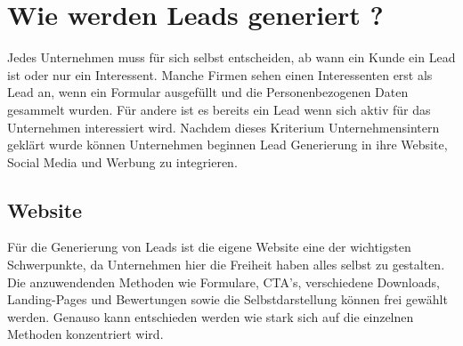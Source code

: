 \section{Wie werden Leads generiert ?}
Jedes Unternehmen muss für sich selbst entscheiden, ab wann ein Kunde ein Lead ist oder nur ein Interessent. Manche Firmen sehen einen Interessenten erst als Lead an, wenn ein Formular ausgefüllt und die Personenbezogenen Daten gesammelt wurden. Für andere ist es bereits ein Lead wenn sich aktiv für das Unternehmen interessiert wird. Nachdem dieses Kriterium Unternehmensintern geklärt wurde können Unternehmen beginnen Lead Generierung in ihre Website, Social Media und Werbung zu integrieren. 

\subsection{Website}
Für die Generierung von Leads ist die eigene Website eine der wichtigsten Schwerpunkte, da Unternehmen hier die Freiheit haben alles selbst zu gestalten. Die anzuwendenden Methoden wie Formulare, CTA's, verschiedene Downloads, Landing-Pages und Bewertungen sowie die Selbstdarstellung können frei gewählt werden. Genauso kann entschieden werden wie stark sich auf die einzelnen Methoden konzentriert wird.

